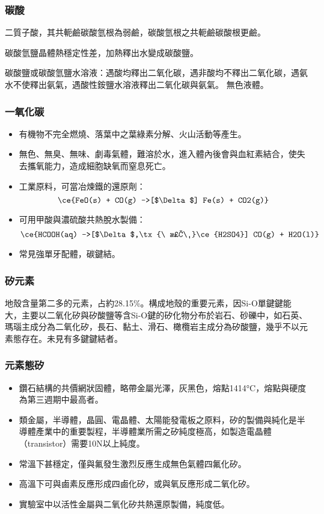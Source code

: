 \documentclass[a4paper,12pt]{report}
\begin{document}
\subsubsection{碳酸}
\bit
\item 二質子酸，其共軛鹼碳酸氫根為弱鹼，碳酸氫根之共軛鹼碳酸根更鹼。
\item 碳酸氫鹽晶體熱穩定性差，加熱釋出水變成碳酸鹽。
\item 碳酸鹽或碳酸氫鹽水溶液：遇酸均釋出二氧化碳，遇非酸均不釋出二氧化碳，遇氨水不使釋出氨氣，遇酸性銨鹽水溶液釋出二氧化碳與氨氣。
\eit
{}
無色液體。
\subsubsection{一氧化碳}
\begin{itemize}
\item 有機物不完全燃燒、落葉中之葉綠素分解、火山活動等產生。
\item 無色、無臭、無味、劇毒氣體，難溶於水，進入體內後會與血紅素結合，使失去攜氧能力，造成細胞缺氧而窒息死亡。
\item 工業原料，可當冶煉鐵的還原劑：
\[\ce{FeO(s) + CO(g) ->[$\Delta$] Fe(s) + CO2(g)}\]
\item 可用甲酸與濃硫酸共熱脫水製備：
\[\ce{HCOOH(aq) ->[$\Delta$,\tx{\ 濃\ }\ce{H2SO4}] CO(g) + H2O(l)}\]
\item 常見強單牙配體，碳鍵結。
\end{itemize}
\subsubsection{矽元素}
地殼含量第二多的元素，占約28.15\%。構成地殼的重要元素，因Si-O單鍵鍵能大，主要以二氧化矽與矽酸鹽等含Si-O鍵的矽化物分布於岩石、砂礫中，如石英、瑪瑙主成分為二氧化矽，長石、黏土、滑石、橄欖岩主成分為矽酸鹽，幾乎不以元素態存在。未見有多鍵鍵結者。
\subsubsection{元素態矽}
\begin{itemize}
\item 鑽石結構的共價網狀固體，略帶金屬光澤，灰黑色，熔點1414°C，熔點與硬度為第三週期中最高者。
\item 類金屬，半導體，晶圓、電晶體、太陽能發電板之原料，矽的製備與純化是半導體產業中的重要製程，半導體業所需之矽純度極高，如製造電晶體（transistor）需要10N以上純度。
\item 常溫下甚穩定，僅與氟發生激烈反應生成無色氣體四氟化矽。
\item 高溫下可與鹵素反應形成四鹵化矽，或與氧反應形成二氧化矽。
\item  實驗室中以活性金屬與二氧化矽共熱還原製備，純度低。
\end{itemize}
\end{document}
